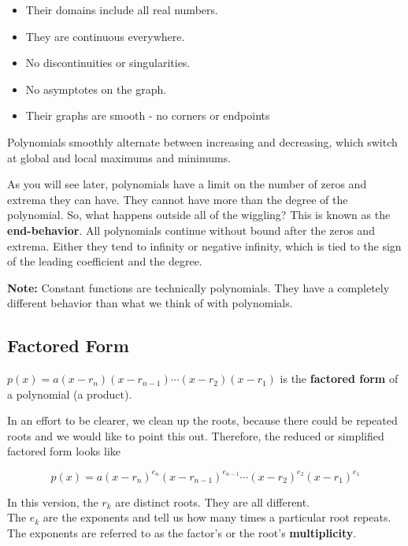 \documentclass{ximera}
\begin{document}
\begin{itemize}
\item Their domains include all real numbers. 
\item They are continuous everywhere.
\item No discontinuities or singularities.
\item No asymptotes on the graph.
\item Their graphs are smooth - no corners or endpoints
\end{itemize}


Polynomials smoothly alternate between increasing and decreasing, which switch at global and local maximums and minimums.

As you will see later, polynomials have a limit on the number of zeros and extrema they can have.  They cannot have more than the degree of the polynomial. So, what happens outside all of the wiggling?  This is known as the \textbf{end-behavior}.  All polynomials continue without bound after the zeros and extrema.  Either they tend to infinity or negative infinity, which is tied to the sign of the leading coefficient and the degree.


\textbf{Note:} Constant functions are technically polynomials. They have a completely different behavior than what we think of with polynomials.












\subsection*{Factored Form}








$p(x) = a (x-r_n)(x-r_{n-1})  \cdots (x-r_2)(x-r_1)$ is the \textbf{factored form} of a polynomial (a product).  

In an effort to be clearer, we clean up the roots, because there could be repeated roots and we would like to point this out.  Therefore, the reduced or simplified factored form looks like




\[   p(x) = a (x-r_n)^{e_n} (x-r_{n-1})^{e_{n-1}}  \cdots (x-r_2)^{e_2} (x-r_1)^{e_1}  \]



In this version, the $r_k$ are distinct roots.  They are all different. \\
The $e_k$ are the exponents and tell us how many times a particular root repeats.  The exponents are referred to as the factor's or the root's \textbf{multiplicity}.
\end{document}
